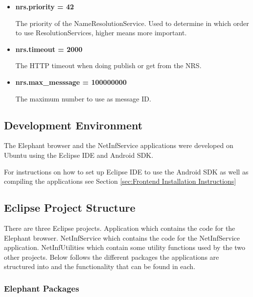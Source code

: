 \begin{itemize}
	\item{\bf nrs.priority = 42}	
	
	The priority of the NameResolutionService. Used to determine in which order to use ResolutionServices, higher means more important.	
	
	\item{\bf nrs.timeout = 2000}
	
	The HTTP timeout when doing publish or get from the NRS.
	
	\item{\bf nrs.max\_messsage = 100000000}
	
	The maximum number to use as message ID.
	
\end{itemize}

\subsection{Development Environment}

The Elephant browser and the NetInfService applications were developed on Ubuntu using the Eclipse IDE and Android SDK.

For instructions on how to set up Eclipse IDE to use the Android SDK as well as compiling the applications see Section \ref{sec:Frontend Installation Instructions}

\subsection{Eclipse Project Structure}

There are three Eclipse projects. Application which contains the code for the Elephant browser. NetInfService which contains the code for the NetInfService application. NetInfUtilities which contain some utility functions used by the two other projects. Below follows the different packages the applications are structured into and the functionality that can be found in each.

\subsubsection{Elephant Packages}

